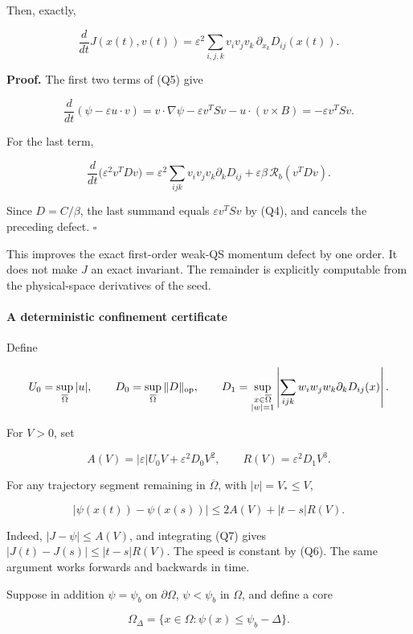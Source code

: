 Then, exactly,

\[
\frac{d}{dt}J(x(t),v(t))
 =\varepsilon^2
   \sum_{i,j,k}v_i v_j v_k\,\partial_{x_k}D_{ij}(x(t)).
\tag{Q7}
\]

\textbf{Proof.} The first two terms of (Q5) give

\[
\frac d{dt}(\psi-\varepsilon u\cdot v)
 =v\cdot\nabla\psi-\varepsilon v^TSv-u\cdot(v\times B)
 =-\varepsilon v^TSv.
\]

For the last term,

\[
\frac d{dt}\big(\varepsilon^2v^TDv\big)
 =\varepsilon^2\sum_{ijk}v_iv_jv_k\partial_kD_{ij}
  +\varepsilon\beta\,\mathcal R_b(v^TDv).
\]

Since \(D=C/\beta\), the last summand equals \(\varepsilon v^TSv\) by
(Q4), and cancels the preceding defect. \(\square\)

This improves the exact first-order weak-QS momentum defect by one
order. It does not make \(J\) an exact invariant. The remainder is
explicitly computable from the physical-space derivatives of the seed.

\paragraph{A deterministic confinement
certificate}\label{a-deterministic-confinement-certificate}

Define

\[
U_0=\sup_{\overline\Omega}|u|,\qquad
D_0=\sup_{\overline\Omega}\|D\|_{\rm op},\qquad
D_1=\sup_{\substack{x\in\overline\Omega\\ |w|=1}}
\left|\sum_{ijk}w_iw_jw_k\partial_kD_{ij}(x)\right|.
\]

For \(V>0\), set

\[
A(V)=|\varepsilon|U_0V+\varepsilon^2D_0V^2,\qquad
R(V)=\varepsilon^2D_1V^3.
\]

For any trajectory segment remaining in \(\overline\Omega\), with
\(|v|=V_*\le V\),

\[
|\psi(x(t))-\psi(x(s))|
 \le 2A(V)+|t-s|R(V).
\tag{Q8}
\]

Indeed, \(|J-\psi|\le A(V)\), and integrating (Q7) gives
\(|J(t)-J(s)|\le |t-s|R(V)\). The speed is constant by (Q6). The same
argument works forwards and backwards in time.

Suppose in addition \(\psi=\psi_b\) on \(\partial\Omega\),
\(\psi<\psi_b\) in \(\Omega\), and define a core

\[
\Omega_\Delta=\{x\in\Omega:\psi(x)\le\psi_b-\Delta\}.
\]

